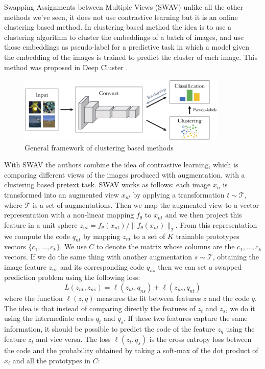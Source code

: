 Swapping Assignments between Multiple Views (SWAV) \cite{caron2020unsupervised} unlike all the other methods we've seen, it does not use contrastive learning but it is an online clustering based method. In clustering based method the idea is to use a clustering algorithm to cluster the embeddings of a batch of images, and use those embeddings as pseudo-label for a predictive task in which a model given the embedding of the images is trained to predict the cluster of each image. This method was proposed in Deep Cluster \cite{caron2018deep}.
\begin{figure}[H]
	\centering
	\includegraphics[width=10cm]{./images/deep_cluster.png}
	\caption{General framework of clustering based methods}
\end{figure}
\noindent With SWAV the authors combine the idea of contrastive learning, which is comparing different views of the images produced with augmentation, with a clustering based pretext task. SWAV works as follows: each image $x_n$ is transformed into an augmented view $x_{nt}$ by applying a transformation $t \sim \mathcal{T}$, where $\mathcal{T}$ is a set of augmentations. Then we map the augmented view to a vector representation with a non-linear mapping $f_\theta$ to $x_{nt}$ and we then project this feature in a unit sphere $z_{nt} = f_\theta(x_{nt})/\lVert f_\theta(x_{nt}) \rVert_2$. From this representation we compute the code $q_{nt}$ by mapping $z_{nt}$ to a set of $K$ trainable prototypes vectors $\{c_1, \dots, c_k\}$. We use $C$ to denote the matrix whose columns are the $c_1, \dots, c_k$ vectors. If we do the same thing with another augmentation $s \sim \mathcal{T}$, obtaining the image feature $z_{ns}$ and its corresponding code $q_{ns}$ then we can set a swapped prediction problem using the following loss:
\[ L(z_{nt}, z_{ns}) = \ell(z_{nt}, q_{ns}) + \ell(z_{ns}, q_{nt}) \]
where the function $\ell(z, q)$ measures the fit between features $z$ and the code $q$. The idea is that instead of comparing directly the features of $z_t$ and $z_s$, we do it using the intermediate codes $q_t$ and $q_s$. If these two features capture the same information, it should be possible to predict the code of the feature $z_q$ using the feature $z_t$ and vice versa. The loss $\ell(z_t, q_s)$ is the cross entropy loss between the code and the probability obtained by taking a soft-max of the dot product of $x_i$ and all the prototypes in $C$:
